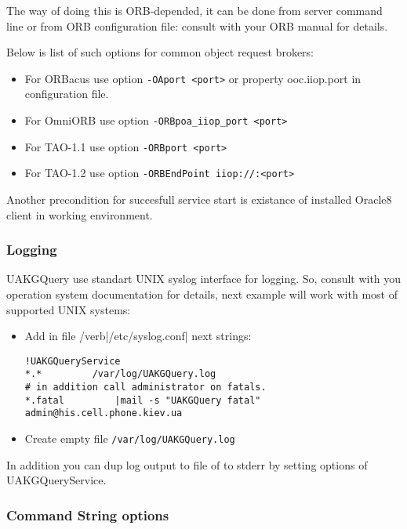 \documentclass[10pt]{article}
\begin{document}
 The way of doing this is ORB-depended, it can be done from server command
 line or from ORB configuration file: consult with your ORB manual for details.
 
 Below is list of such options for common object request brokers:

\begin{itemize}
 \item For ORBacus use option \verb|-OAport <port>| or property ooc.iiop.port in
configuration file.
 \item For OmniORB use option \verb|-ORBpoa_iiop_port <port>|  
 \item For TAO-1.1 use option \verb|-ORBport <port>|
 \item For TAO-1.2 use option \verb|-ORBEndPoint iiop://:<port>|
\end{itemize}

 Another precondition for succesfull service start is existance of installed
Oracle8 client in working environment.

\subsubsection{ Logging  }

 UAKGQuery use standart UNIX syslog interface for logging. So, consult with
you operation system documentation for details, next example will work
with most of supported UNIX systems:
\begin{itemize}
\item Add in file /verb|/etc/syslog.conf| next strings:
\begin{verbatim}
!UAKGQueryService
*.*			/var/log/UAKGQuery.log
# in addition call administrator on fatals. 
*.fatal			|mail -s "UAKGQuery fatal" admin@his.cell.phone.kiev.ua
\end{verbatim}
\item Create empty file \verb|/var/log/UAKGQuery.log|
\end{itemize}

 In addition you can dup log output to file of to stderr by setting 
options of UAKGQueryService.

\subsubsection{ Command String options  }
\end{document}
